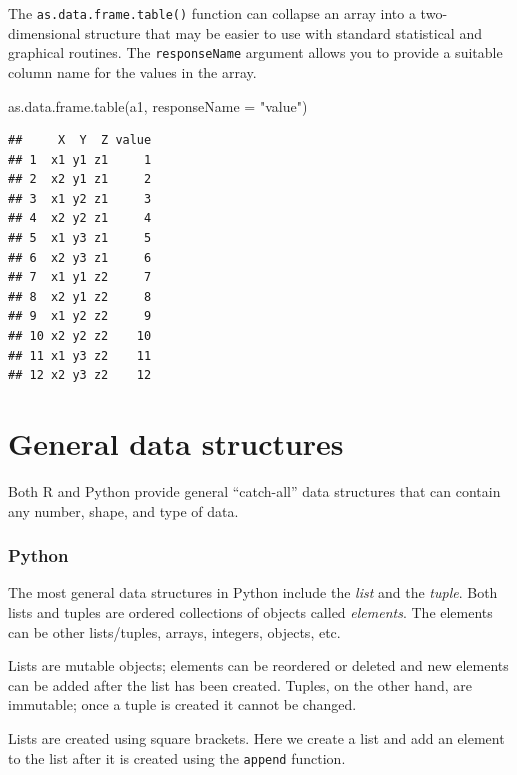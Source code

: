 \documentclass[
]{book}
\newenvironment{Shaded}{\begin{snugshade}}{\end{snugshade}}
\newcommand{\AttributeTok}[1]{\textcolor[rgb]{0.77,0.63,0.00}{#1}}
\newcommand{\FunctionTok}[1]{\textcolor[rgb]{0.00,0.00,0.00}{#1}}
\newcommand{\NormalTok}[1]{#1}
\newcommand{\StringTok}[1]{\textcolor[rgb]{0.31,0.60,0.02}{#1}}
\begin{document}
The \texttt{as.data.frame.table()} function can collapse an array into a two-dimensional structure that may be easier to use with standard statistical and graphical routines. The \texttt{responseName} argument allows you to provide a suitable column name for the values in the array.

\begin{Shaded}
\begin{Highlighting}[]
\FunctionTok{as.data.frame.table}\NormalTok{(a1, }\AttributeTok{responseName =} \StringTok{"value"}\NormalTok{)}
\end{Highlighting}
\end{Shaded}

\begin{verbatim}
##     X  Y  Z value
## 1  x1 y1 z1     1
## 2  x2 y1 z1     2
## 3  x1 y2 z1     3
## 4  x2 y2 z1     4
## 5  x1 y3 z1     5
## 6  x2 y3 z1     6
## 7  x1 y1 z2     7
## 8  x2 y1 z2     8
## 9  x1 y2 z2     9
## 10 x2 y2 z2    10
## 11 x1 y3 z2    11
## 12 x2 y3 z2    12
\end{verbatim}

\hypertarget{general-data-structures}{%
\section{General data structures}\label{general-data-structures}}

Both R and Python provide general ``catch-all'' data structures that can contain any number, shape, and type of data.

\hypertarget{python-11}{%
\subsubsection*{Python}\label{python-11}}

The most general data structures in Python include the \emph{list} and the \emph{tuple}. Both lists and tuples are ordered collections of objects called \emph{elements}. The elements can be other lists/tuples, arrays, integers, objects, etc.

Lists are mutable objects; elements can be reordered or deleted and new elements can be added after the list has been created. Tuples, on the other hand, are immutable; once a tuple is created it cannot be changed.

Lists are created using square brackets. Here we create a list and add an element to the list after it is created using the \texttt{append} function.
\end{document}
